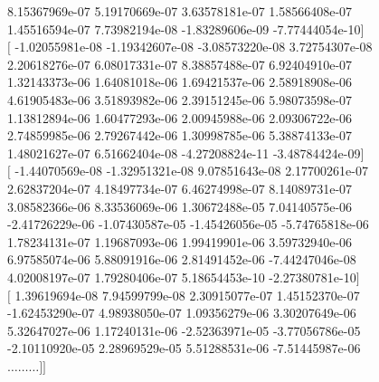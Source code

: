 \documentclass{article}
\begin{document}
    8.15367969e-07   5.19170669e-07   3.63578181e-07   1.58566408e-07 \\
    1.45516594e-07   7.73982194e-08  -1.83289606e-09  -7.77444054e-10$]$ \\
 $[$ -1.02055981e-08  -1.19342607e-08  -3.08573220e-08   3.72754307e-08 \\
    2.20618276e-07   6.08017331e-07   8.38857488e-07   6.92404910e-07 \\
    1.32143373e-06   1.64081018e-06   1.69421537e-06   2.58918908e-06 \\
    4.61905483e-06   3.51893982e-06   2.39151245e-06   5.98073598e-07 \\
    1.13812894e-06   1.60477293e-06   2.00945988e-06   2.09306722e-06 \\
    2.74859985e-06   2.79267442e-06   1.30998785e-06   5.38874133e-07 \\
    1.48021627e-07   6.51662404e-08  -4.27208824e-11  -3.48784424e-09$]$ \\
 $[$ -1.44070569e-08  -1.32951321e-08   9.07851643e-08   2.17700261e-07 \\
    2.62837204e-07   4.18497734e-07   6.46274998e-07   8.14089731e-07 \\
    3.08582366e-06   8.33536069e-06   1.30672488e-05   7.04140575e-06 \\
   -2.41726229e-06  -1.07430587e-05  -1.45426056e-05  -5.74765818e-06 \\
    1.78234131e-07   1.19687093e-06   1.99419901e-06   3.59732940e-06 \\
    6.97585074e-06   5.88091916e-06   2.81491452e-06  -7.44247046e-08 \\
    4.02008197e-07   1.79280406e-07   5.18654453e-10  -2.27380781e-10$]$ \\
 $[$  1.39619694e-08   7.94599799e-08   2.30915077e-07   1.45152370e-07 \\
   -1.62453290e-07   4.98938050e-07   1.09356279e-06   3.30207649e-06 \\
    5.32647027e-06   1.17240131e-06  -2.52363971e-05  -3.77056786e-05 \\
   -2.10110920e-05   2.28969529e-05   5.51288531e-06  -7.51445987e-06 \\
   $\dots \dots \dots ]]$

\newpage
\end{document}
